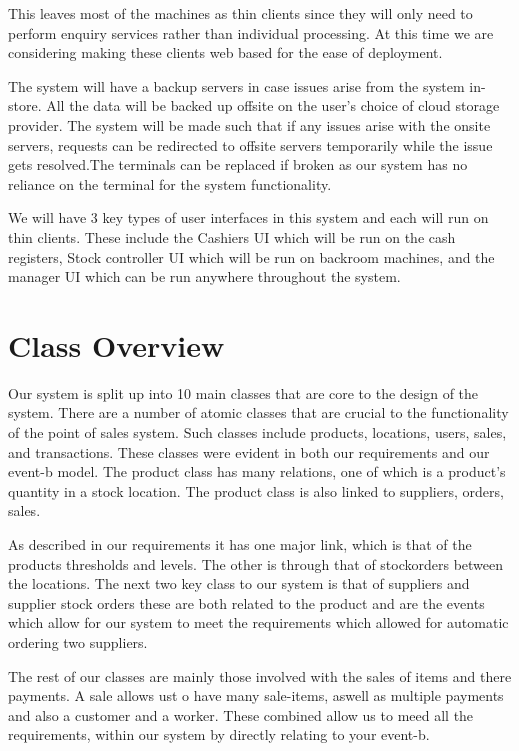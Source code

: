 \documentclass[a4paper]{article}
\begin{document}
This leaves most of the machines as thin clients since they will only need to perform enquiry services rather than individual processing. At this time we are considering making these clients web based for the ease of deployment. 

The system will have a backup servers in case issues arise from the system in-store. All the data will be backed up offsite on the user’s choice of cloud storage provider. The system will be made such that if any issues arise with the onsite servers, requests can be redirected to offsite servers temporarily while the issue gets resolved.The terminals can be replaced if broken as our system has no reliance on the terminal for the system functionality. 

We will have 3 key types of user interfaces in this system and each will run on thin clients. These include the Cashiers UI which will be run on the cash registers, Stock controller UI which will be run on backroom machines, and the manager UI which can be run anywhere throughout the system. 



\pagebreak

\section{Class Overview }

Our system is split up into 10 main classes that are core to the design of the system. There are a number of atomic classes that are crucial to the functionality of the point of sales system. Such classes include products, locations, users, sales, and transactions. These classes were evident in both our requirements and our event-b model. The product class has many relations, one of which is a product’s quantity in a stock location. The product class is also linked to suppliers, orders, sales.

As described in our requirements it has one major link, which is that of the products thresholds and levels. The other is through that of stockorders between the locations. The next two key class to our system is that of suppliers and supplier stock orders these are both related to the product and are the events which allow for our system to meet the requirements which allowed for automatic ordering two suppliers.  

The rest of our classes are mainly those involved with the sales of items and there payments. A sale allows ust o have many sale-items, aswell as multiple payments and also a customer and a worker. These combined allow us to meed all the requirements, within our system by directly relating to your event-b.
\end{document}
